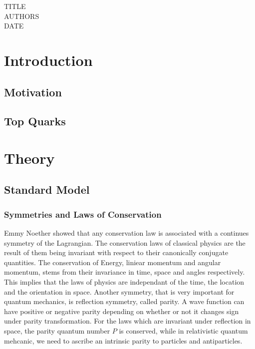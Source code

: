 \documentclass[11pt,a4paper]{article}
\begin{document}
TITLE\\
AUTHORS\\
DATE

\cleardoublepage{}
\begin{abstract}
  
\end{abstract}
\cleardoublepage{}
\tableofcontents{}
\section{Introduction}

\subsection{Motivation}

\subsection{Top Quarks}

\section{Theory}

\subsection{Standard Model}

\subsubsection{Symmetries and Laws of Conservation} Emmy Noether showed that any
conservation law is associated with a continues symmetry of the Lagrangian. The
conservation laws of classical physics are the result of them being invariant
with respect to their canonically conjugate quantities. The conservation of
Energy, liniear momentum and angular momentum, stems from their invariance in
time, space and angles respectively. This implies that the laws of physics are
independant of the time, the location and the orientation in space. Another
symmetry, that is very important for quantum mechanics, is reflection symmetry,
called parity. A wave function can have positive or negative parity depending on
whether or not it changes sign under parity transformation. For the laws which
are invariant under reflection in space, the parity quantum number $P$ is
conserved, while in relativistic quantum mehcanic, we need to ascribe an
intrinsic parity to particles and antiparticles.\\
\end{document}
